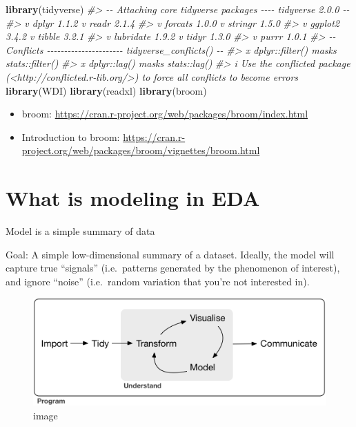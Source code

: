 \documentclass[
  xelatex, ja=standard]{bxjsbook}
\newenvironment{Shaded}{\begin{snugshade}}{\end{snugshade}}
\newcommand{\CommentTok}[1]{\textcolor[rgb]{0.56,0.35,0.01}{\textit{#1}}}
\newcommand{\FunctionTok}[1]{\textcolor[rgb]{0.13,0.29,0.53}{\textbf{#1}}}
\newcommand{\NormalTok}[1]{#1}
\providecommand{\tightlist}{%
  \setlength{\itemsep}{0pt}\setlength{\parskip}{0pt}}
\theoremstyle{definition}
\theoremstyle{definition}
\theoremstyle{definition}
\theoremstyle{definition}
\theoremstyle{remark}
\begin{document}
\begin{Shaded}
\begin{Highlighting}[]
\FunctionTok{library}\NormalTok{(tidyverse)}
\CommentTok{\#\textgreater{} {-}{-} Attaching core tidyverse packages {-}{-}{-}{-} tidyverse 2.0.0 {-}{-}}
\CommentTok{\#\textgreater{} v dplyr     1.1.2     v readr     2.1.4}
\CommentTok{\#\textgreater{} v forcats   1.0.0     v stringr   1.5.0}
\CommentTok{\#\textgreater{} v ggplot2   3.4.2     v tibble    3.2.1}
\CommentTok{\#\textgreater{} v lubridate 1.9.2     v tidyr     1.3.0}
\CommentTok{\#\textgreater{} v purrr     1.0.1     }
\CommentTok{\#\textgreater{} {-}{-} Conflicts {-}{-}{-}{-}{-}{-}{-}{-}{-}{-}{-}{-}{-}{-}{-}{-}{-}{-}{-}{-}{-}{-} tidyverse\_conflicts() {-}{-}}
\CommentTok{\#\textgreater{} x dplyr::filter() masks stats::filter()}
\CommentTok{\#\textgreater{} x dplyr::lag()    masks stats::lag()}
\CommentTok{\#\textgreater{} i Use the conflicted package (\textless{}http://conflicted.r{-}lib.org/\textgreater{}) to force all conflicts to become errors}
\FunctionTok{library}\NormalTok{(WDI)}
\FunctionTok{library}\NormalTok{(readxl)}
\FunctionTok{library}\NormalTok{(broom)}
\end{Highlighting}
\end{Shaded}

\begin{itemize}
\tightlist
\item
  broom: \url{https://cran.r-project.org/web/packages/broom/index.html}
\item
  Introduction to broom: \url{https://cran.r-project.org/web/packages/broom/vignettes/broom.html}
\end{itemize}

\hypertarget{what-is-modeling-in-eda}{%
\section{What is modeling in EDA}\label{what-is-modeling-in-eda}}

Model is a simple summary of data

Goal: A simple low-dimensional summary of a dataset. Ideally, the model will capture true ``signals'' (i.e.~patterns generated by the phenomenon of interest), and ignore ``noise'' (i.e.~random variation that you're not interested in).

\begin{figure}
\centering
\includegraphics{data/data-science.png}
\caption{image}
\end{figure}
\end{document}
